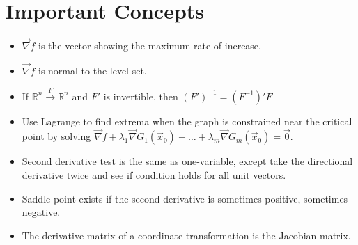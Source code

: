 \documentclass[11pt]{article}
\begin{document}
\section*{Important Concepts}
	\begin{itemize}
		\item $\vec{\nabla}f$ is the vector showing the maximum rate of increase.
		\item $\vec{\nabla}f$ is normal to the level set.
		\item If $\mathbb{R}^n \xrightarrow{F} \mathbb{R}^n$ and $F'$ is invertible, then $(F')^{-1} = (F^{-1})'F$
		\item Use Lagrange to find extrema when the graph is constrained near the critical point by solving $\vec{\nabla} f + \lambda_1 \vec{\nabla} G_1(\vec{x}_0) + \ldots + \lambda_m \vec{\nabla} G_m(\vec{x}_0) = \vec{0}$.
		\item Second derivative test is the same as one-variable, except take the directional derivative twice and see if condition holds for all unit vectors.
		\item Saddle point exists if the second derivative is sometimes positive, sometimes negative.
		\item The derivative matrix of a coordinate transformation is the Jacobian matrix.
	\end{itemize}
		
%		
%		


\end{document}
